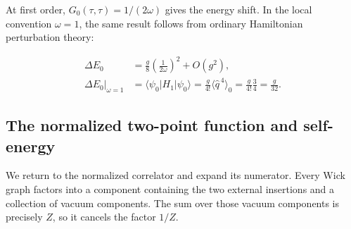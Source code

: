 At first order, $G_0(\tau,\tau)=1/(2\omega)$ gives the energy shift. In the
local convention $\omega=1$, the same result follows from ordinary Hamiltonian
perturbation theory:

\begin{equation}
 \begin{aligned}
 \Delta E_0&=\frac{g}{8}\left(\frac{1}{2\omega}\right)^2+O(g^2),\\
 \left.\Delta E_0\right|_{\omega=1}
 &=\langle\psi_0|H_1|\psi_0\rangle
 =\frac{g}{4!}\langle\widehat q^{\,4}\rangle_0
 =\frac{g}{4!}\frac{3}{4}=\frac{g}{32}.
 \end{aligned}
 \label{eq:253a-first-vacuum-energy-shift}
\end{equation}

\subsection{The normalized two-point function and self-energy}
\label{sec:253a-self-energy}

We return to the normalized correlator and expand its numerator. Every Wick
graph factors into a component containing the two external insertions and a
collection of vacuum components. The sum over those vacuum components is
precisely $Z$, so it cancels the factor $1/Z$.


